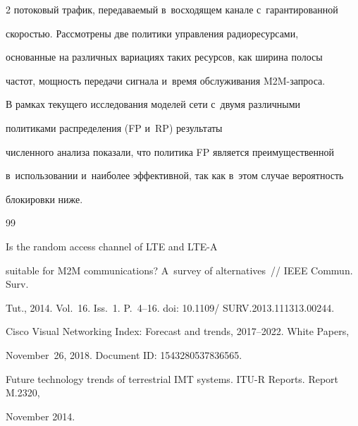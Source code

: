 \begin{multicols}{2}
потоковый трафик, передаваемый в~восходящем канале с~гарантированной 


скоростью. Рассмотрены две политики управления радиоресурсами, 


основанные на различных вариациях таких ресурсов, как ширина полосы 


частот, мощность передачи сигнала и~время обслуживания M2M-за\-проса.


  


  В рамках текущего исследования моделей сети с~двумя различными 


политиками распределения (FP и~RP) результаты 


численного анализа показали, что политика FP является преимущественной 


в~использовании и~наиболее эффективной, так как в~этом случае ве\-ро\-ят\-ность 


блокировки ниже.










{\small\frenchspacing


 {%




 \begin{thebibliography}{99}




 Is the random access channel of LTE and LTE-A 


suitable for M2M communications? A~survey of alternatives~// IEEE Commun. Surv. 


Tut., 2014. Vol.~16. Iss.~1. P.~4--16. doi: 10.1109/ SURV.2013.111313.00244.




Cisco Visual Networking Index: Forecast and trends, 2017--2022. White Papers, 


November~26, 2018. Document ID: 1543280537836565.




Future technology trends of terrestrial IMT systems. \mbox{ITU-R} Reports. Report M.2320,


November 2014.





\end{thebibliography}}}
\end{multicols}
